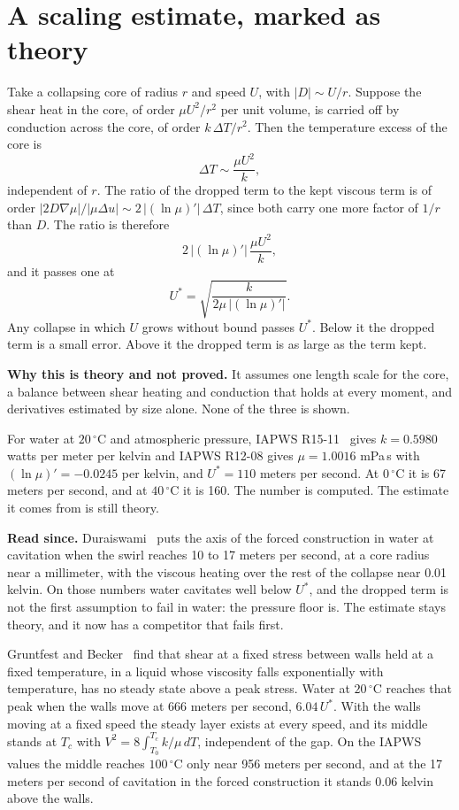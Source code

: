 \section{A scaling estimate, marked as theory}

Take a collapsing core of radius $r$ and speed $U$, with $|D| \sim U/r$. Suppose the shear heat in
the core, of order $\mu U^2/r^2$ per unit volume, is carried off by conduction across the core, of
order $k\,\Delta T/r^2$. Then the temperature excess of the core is
\[
\Delta T \sim \frac{\mu U^2}{k},
\]
independent of $r$. The ratio of the dropped term to the kept viscous term is of order
$|2D\nabla\mu| / |\mu\Delta u| \sim 2\,|(\ln\mu)'|\,\Delta T$, since both carry one more factor of
$1/r$ than $D$. The ratio is therefore
\[
2\,|(\ln\mu)'|\,\frac{\mu U^2}{k},
\]
and it passes one at
\[
U^* = \sqrt{\frac{k}{2\mu\,|(\ln\mu)'|}} .
\]
Any collapse in which $U$ grows without bound passes $U^*$. Below it the dropped term is a small
error. Above it the dropped term is as large as the term kept.

\textbf{Why this is theory and not proved.} It assumes one length scale for the core, a balance
between shear heating and conduction that holds at every moment, and derivatives estimated by size
alone. None of the three is shown.

For water at $20\,^\circ$C and atmospheric pressure, IAPWS R15-11~\cite{src:IAPWS-R15-11} gives $k = 0.5980$ watts per
meter per kelvin and IAPWS R12-08 gives $\mu = 1.0016$ mPa\,s with $(\ln\mu)' = -0.0245$ per
kelvin, and $U^* = 110$ meters per second. At $0\,^\circ$C it is 67 meters per second, and at
$40\,^\circ$C it is 160. The number is computed. The estimate it comes from is still theory.

\textbf{Read since.} Duraiswami~\cite{src:Duraiswami-2026} puts the axis of the forced
construction in water at cavitation when the swirl reaches 10 to 17 meters per second, at a core
radius near a millimeter, with the viscous heating over the rest of the collapse near 0.01 kelvin.
On those numbers water cavitates well below $U^*$, and the dropped term is not the first
assumption to fail in water: the pressure floor is. The estimate stays theory, and it now has a
competitor that fails first.

Gruntfest and Becker~\cite{src:Gruntfest-and-Becker-1964} find that shear at a fixed stress
between walls held at a fixed temperature, in a liquid whose viscosity falls exponentially with
temperature, has no steady state above a peak stress. Water at $20\,^\circ$C reaches that peak
when the walls move at 666 meters per second, $6.04\,U^*$. With the walls moving at a fixed speed
the steady layer exists at every speed, and its middle stands at $T_c$ with
$V^2 = 8\int_{T_0}^{T_c} k/\mu\,dT$, independent of the gap. On the IAPWS values the middle
reaches $100\,^\circ$C only near 956 meters per second, and at the 17 meters per second of
cavitation in the forced construction it stands 0.06 kelvin above the walls.

